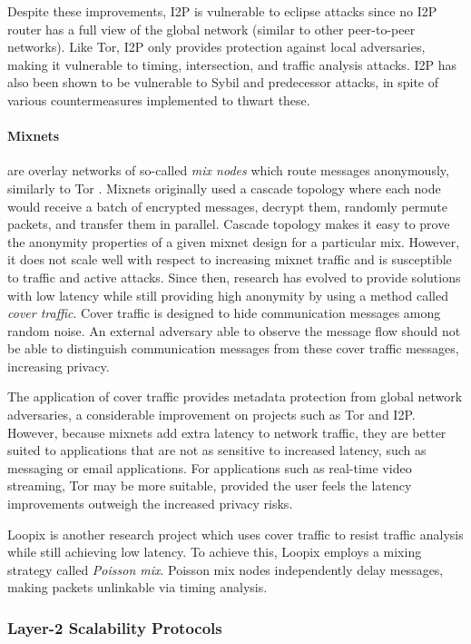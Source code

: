 Despite these improvements, I2P is vulnerable to eclipse attacks since no I2P router has a full view of the global network (similar to other peer-to-peer networks). Like Tor, I2P only provides protection against local adversaries, making it vulnerable to timing, intersection, and traffic analysis attacks. I2P has also been shown to be vulnerable to Sybil and predecessor attacks, in spite of various countermeasures implemented to thwart these.

\paragraph{Mixnets} are overlay networks of so-called \textit{mix nodes} which route messages anonymously, similarly to Tor \cite{mixnets}. Mixnets originally used a cascade topology where each node would receive a batch of encrypted messages, decrypt them, randomly permute packets, and transfer them in parallel. Cascade topology makes it easy to prove the anonymity properties of a given mixnet design for a particular mix. However, it does not scale well with respect to increasing mixnet traffic and is susceptible to traffic and active attacks. Since then, research has evolved to provide solutions with low latency while still providing high anonymity by using a method called \textit{cover traffic}. Cover traffic is designed to hide communication messages among random noise. An external adversary able to observe the message flow should not be able to
distinguish communication messages from these cover traffic messages, increasing privacy.

The application of cover traffic provides metadata protection from global network adversaries, a considerable improvement on projects such as Tor and I2P. However, because mixnets add extra latency to network traffic, they are better suited to applications that are not as sensitive to increased latency, such as messaging or email applications. For applications such as real-time video streaming, Tor may be more suitable, provided the user feels the latency improvements outweigh the increased privacy risks.

Loopix \cite{loopix} is another research project which uses cover traffic to resist traffic analysis while still achieving low latency. To achieve this, Loopix employs a mixing strategy called \textit{Poisson mix}. Poisson mix nodes independently delay messages, making packets unlinkable via timing analysis.

\subsubsection{Layer-2 Scalability Protocols}
\label{sec:l2protocols}

